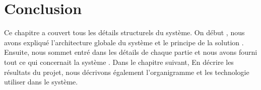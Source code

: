 \break
\section{Conclusion}
Ce chapitre a couvert tous les détails structurels du système. On début , nous avons expliqué l'architecture globale du système et le principe de la solution . Ensuite, nous sommet entré dans les détails de chaque partie et nous avons
fourni tout ce qui concernait la système .
Dans le chapitre suivant, En décrire les résultats du projet, nous décrivons également l'organigramme et les technologie utiliser
dans le système.
 